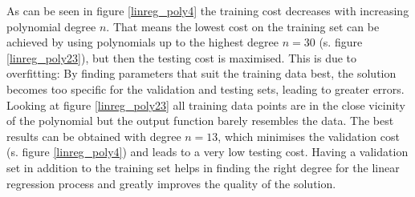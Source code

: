 \documentclass{article}
\begin{document}
%
%
%

As can be seen in figure \ref{linreg_poly4} the training cost decreases with increasing polynomial degree $n$. That means the lowest cost on the training set can be achieved by using polynomials up to the highest degree $n=30$ (s. figure \ref{linreg_poly23}), but then the testing cost is maximised. This is due to overfitting: By finding parameters that suit the training data best, the solution becomes too specific for the validation and testing sets, leading to greater errors. Looking at figure \ref{linreg_poly23} all training data points are in the close vicinity of the polynomial but the output function barely resembles the data. The best results can be obtained with degree $n=13$, which minimises the validation cost (s. figure \ref{linreg_poly4}) and leads to a very low testing cost. Having a validation set in addition to the training set helps in finding the right degree for the linear regression process and greatly improves the quality of the solution.
\end{document}
